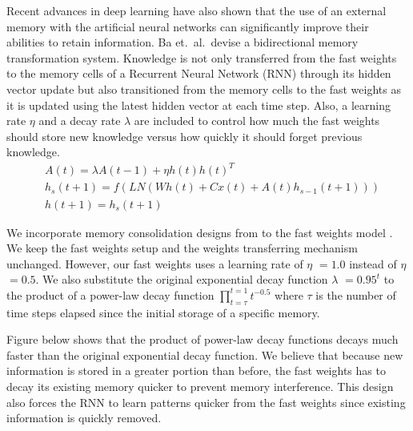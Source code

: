 \documentclass[portrait,a0b,final,a4resizeable]{include/a0poster}
\begin{document}
\begin{poster}
\begin{multicols}{3}
Recent advances in deep learning \cite{dnc, fw} have also shown that the use of an external memory with the artificial neural networks can significantly improve their abilities to retain information.
Ba et.\ al.\ devise a bidirectional memory transformation system.
Knowledge is not only transferred from the fast weights to the memory cells of a Recurrent Neural Network (RNN) through its hidden vector update but also transitioned from the memory cells to the fast weights as it is updated using the latest hidden vector at each time step.
Also, a learning rate $\eta$ and a decay rate $\lambda$ are included to control how much the fast weights should store new knowledge versus how quickly it should forget previous knowledge.
%
\vspace{0.25in}
\begin{align}
    &A(t) = \lambda A(t-1) + \eta h(t) h(t)^T
    \label{eq:external_memory} \\
    &h_s(t+1) = f(LN(Wh(t) + Cx(t) + A(t)h_{s-1}(t+1)))
    \label{eq:hidden_update} \\
    &h(t+1) = h_s(t+1) \label{eq:hidden_assign}
\end{align}
\vspace{1cm}

We incorporate memory consolidation designs from \cite{pld} to the fast weights model \cite{fw}.
We keep the fast weights setup and the weights transferring mechanism unchanged.
However, our fast weights uses a learning rate of $\eta$ $=1.0$ instead of $\eta$ $=0.5$.
We also substitute the original exponential decay function $\lambda$ $=0.95^t$ to the product of a power-law decay function $\prod_{t=\tau}^{t=1} t^{-0.5}$ where $\tau$ is the number of time steps elapsed since the initial storage of a specific memory. 
 

\newpage 
{}
 \vspace{-0.05cm}

Figure below shows that the product of power-law decay functions decays much faster than the original exponential decay function. 
We believe that because new information is stored in a greater portion than before, the fast weights has to decay its existing memory quicker to prevent memory interference. 
This design also forces the RNN to learn patterns quicker from the fast weights since existing information is quickly removed.

\vspace{-0.5in}
\vspace{-1.0in}
\vspace{0.5in}


\end{multicols}
\end{poster}
\end{document}
